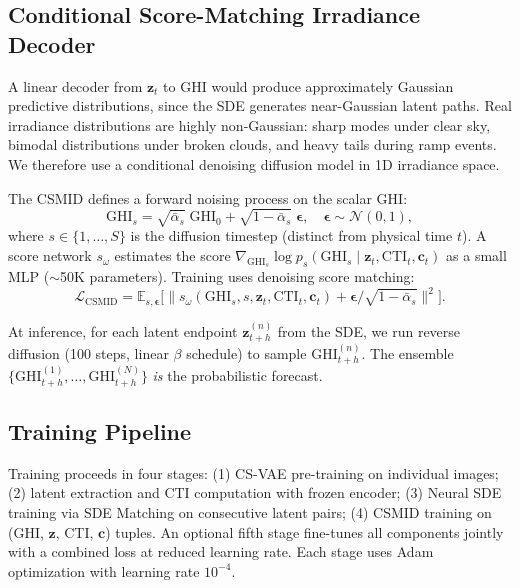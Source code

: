 \documentclass{article}
\begin{document}
\subsection{Conditional Score-Matching Irradiance Decoder}
\label{sec:csmid}

A linear decoder from $\mathbf{z}_t$ to GHI would produce approximately Gaussian predictive distributions, since the SDE generates near-Gaussian latent paths. Real irradiance distributions are highly non-Gaussian: sharp modes under clear sky, bimodal distributions under broken clouds, and heavy tails during ramp events. We therefore use a conditional denoising diffusion model in 1D irradiance space.

The CSMID defines a forward noising process on the scalar GHI:
\begin{equation}
    \text{GHI}_s = \sqrt{\bar{\alpha}_s}\;\text{GHI}_0 + \sqrt{1 - \bar{\alpha}_s}\;\boldsymbol{\epsilon}, \quad \boldsymbol{\epsilon} \sim \mathcal{N}(0, 1),
\end{equation}
where $s \in \{1, \ldots, S\}$ is the diffusion timestep (distinct from physical time $t$). A score network $s_\omega$ estimates the score $\nabla_{\text{GHI}_s} \log p_s(\text{GHI}_s \mid \mathbf{z}_t, \text{CTI}_t, \mathbf{c}_t)$ as a small MLP ($\sim$50K parameters). Training uses denoising score matching:
\begin{equation}
    \mathcal{L}_{\text{CSMID}} = \mathbb{E}_{s, \boldsymbol{\epsilon}} \Big[\big\|s_\omega(\text{GHI}_s, s, \mathbf{z}_t, \text{CTI}_t, \mathbf{c}_t) + \boldsymbol{\epsilon} / \sqrt{1 - \bar{\alpha}_s}\big\|^2\Big].
\end{equation}

At inference, for each latent endpoint $\mathbf{z}_{t+h}^{(n)}$ from the SDE, we run reverse diffusion (100 steps, linear $\beta$ schedule) to sample $\text{GHI}_{t+h}^{(n)}$. The ensemble $\{\text{GHI}_{t+h}^{(1)}, \ldots, \text{GHI}_{t+h}^{(N)}\}$ \emph{is} the probabilistic forecast.

\subsection{Training Pipeline}
\label{sec:training}

Training proceeds in four stages: (1) CS-VAE pre-training on individual images; (2) latent extraction and CTI computation with frozen encoder; (3) Neural SDE training via SDE Matching on consecutive latent pairs; (4) CSMID training on (GHI, $\mathbf{z}$, CTI, $\mathbf{c}$) tuples. An optional fifth stage fine-tunes all components jointly with a combined loss at reduced learning rate. Each stage uses Adam optimization with learning rate $10^{-4}$.
\end{document}
